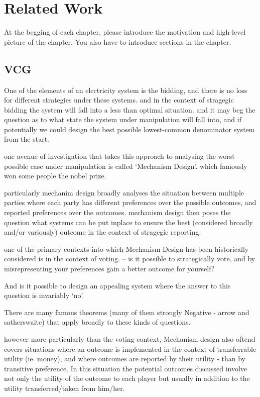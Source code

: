 \section{Related Work}
\label{cha:solutions}
At the begging of each chapter, please introduce the motivation and high-level
picture of the chapter. You also have to introduce sections in the
chapter. \\


\subsection{VCG}


One of the elements of an electricity system is the bidding, and there is no loss for different strategies under these systems.
and in the context of stragegic bidding the system will fall into a less than optimal situation.
and it may beg the question as to what state the system under manipulation will fall into, and if potentially we could design the best possible lowest-common denominator system from the start.

one avenue of investigation that takes this approach to analysing the worst possible case under manipulation is called `Mechanism Design'.
which famously won some people the nobel prize.

particularly mechanim design broadly analyses the situation between multiple parties where each party has different preferences over the possible outcomes, and reported preferences over the outcomes.
mechanism design then poses the question what systems can be put inplace to ensure the best (considered broadly and/or variously) outcome in the context of stragegic reporting.

one of the primary contexts into which Mechanism Design has been historically considered is in the context of voting. -- is it possible to strategically vote, and by misrepresenting your preferences gain a better outcome for yourself?

And is it possible to design an appealing system where the answer to this question is invariably `no'.

There are many famous theorems (many of them strongly Negative - arrow and satherswaite) that apply broadly to these kinds of questions.

however more particularly than the voting context, Mechanism design also oftend covers situations where an outcome is implemented in the context of transferrable utility (ie. money), and where outcomes are reported by their utility - than by transitive preference.
In this situation the potential outcomes discussed involve not only the utility of the outcome to each player but usually in addition to the utility transferred/taken from him/her.

